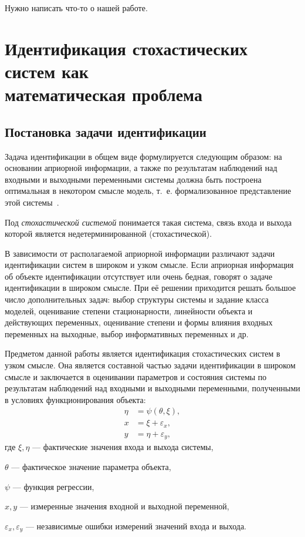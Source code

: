 {\color{red}
  Нужно написать что-то о нашей работе.
}

\section[Идентификация стохастических систем как математическая проблема]{%
  Идентификация стохастических систем как \\
  математическая проблема}

\subsection{Постановка задачи идентификации}

Задача идентификации в общем виде формулируется следующим образом:
на основании априорной информации, а также по результатам наблюдений над
входными и выходными переменными системы должна быть построена оптимальная в
некотором смысле модель, т.~е. формализованное представление этой системы~\cite{eikhoff_1975}.

Под \emph{стохастической системой} понимается такая система, связь входа и выхода которой
является недетерминированной (стохастической).

В зависимости от располагаемой априорной информации различают
задачи идентификации систем в широком и узком смысле.
Если априорная информация об объекте идентификации отсутствует
или очень бедная, говорят о задаче идентификации в широком смысле.
При её решении приходится решать большое число дополнительных задач:
выбор структуры системы и задание класса моделей,
оценивание степени стационарности, линейности объекта и действующих переменных,
оценивание степени и формы влияния входных переменных на выходные,
выбор информативных переменных и др.

Предметом данной работы является идентификация стохастических систем в узком смысле.
Она является составной частью задачи идентификации в широком смысле
и заключается в оценивании параметров и состояния системы по результатам
наблюдений над входными и выходными переменными, полученными в условиях функционирования объекта:
\begin{equation}
  \label{eq:model_general}
  \begin{aligned}
    \eta &= \psi (\theta, \xi), \\
    x &= \xi + \varepsilon_x, \\
    y &= \eta + \varepsilon_y,
  \end{aligned}
\end{equation}
где \( \xi, \eta \) --- фактические значения входа и выхода системы, \par
\( \theta \) --- фактическое значение параметра объекта, \par
\( \psi \) --- функция регрессии, \par
\( x, y \) ---  измеренные значения входной и выходной переменной, \par
\( \varepsilon_x, \varepsilon_y \) ---  независимые ошибки измерений значений входа и выхода.

